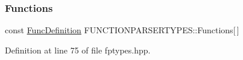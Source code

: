 \subsubsection{\texorpdfstring{Functions}{Functions}}
{\footnotesize\ttfamily const \hyperlink{struct_f_u_n_c_t_i_o_n_p_a_r_s_e_r_t_y_p_e_s_1_1_func_definition}{Func\+Definition} F\+U\+N\+C\+T\+I\+O\+N\+P\+A\+R\+S\+E\+R\+T\+Y\+P\+E\+S\+::\+Functions\mbox{[}$\,$\mbox{]}}



Definition at line 75 of file fptypes.\+hpp.

